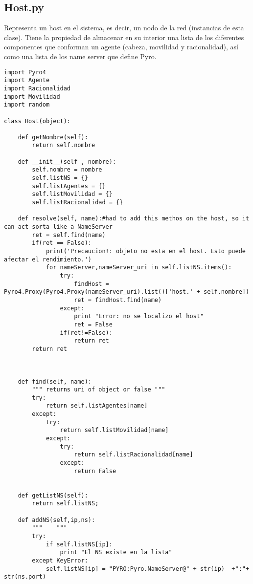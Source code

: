 \documentclass{article}
\begin{document}
\subsection{Host.py}
Representa un host en el sistema, es decir, un nodo de la red (instancias de esta clase). Tiene la propiedad de almacenar en su interior una lista de los diferentes componentes que conforman un agente (cabeza, movilidad y racionalidad), así como una lista de los name server que define Pyro.
\begin{lstlisting}
import Pyro4
import Agente
import Racionalidad
import Movilidad
import random

class Host(object):

    def getNombre(self):
        return self.nombre
    
    def __init__(self , nombre):   
        self.nombre = nombre
        self.listNS = {}
        self.listAgentes = {}
        self.listMovilidad = {}
        self.listRacionalidad = {}
    
    def resolve(self, name):#had to add this methos on the host, so it can act sorta like a NameServer
        ret = self.find(name)
        if(ret == False):
            print('Precaucion!: objeto no esta en el host. Esto puede afectar el rendimiento.')
            for nameServer,nameServer_uri in self.listNS.items():
                try:                
                    findHost = Pyro4.Proxy(Pyro4.Proxy(nameServer_uri).list()['host.' + self.nombre])
                    ret = findHost.find(name)
                except:
                    print "Error: no se localizo el host"
                    ret = False
                if(ret!=False):
                    return ret
        return ret


    
    def find(self, name):
        """ returns uri of object or false """
        try:
            return self.listAgentes[name]
        except:
            try:
                return self.listMovilidad[name]
            except:
                try:
                    return self.listRacionalidad[name]
                except:
                    return False    
    

    def getListNS(self):
        return self.listNS;
        
    def addNS(self,ip,ns):
        """    """
        try:
            if self.listNS[ip]:
                print "El NS existe en la lista"
        except KeyError:
            self.listNS[ip] = "PYRO:Pyro.NameServer@" + str(ip)  +":"+ str(ns.port)
            

\end{lstlisting}
\end{document}
